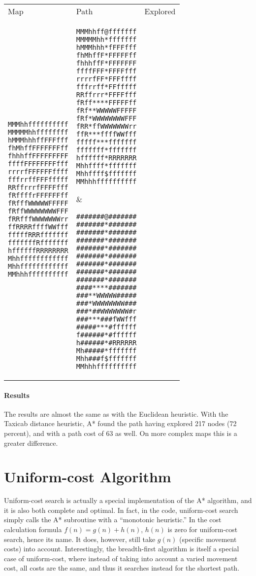 \documentclass[12pt, article]{scrartcl}
\begin{document}
\begin{tabular}{p{2in} p{2in} p{2in}}
Map & Path & Explored \\

\begin{verbatim}
MMMhhffffffffff
MMMMMhhffffffff
hMMMhhhffFFFfff
fhMhffFFFFFFFff
fhhhffFFFFFFFFF
ffffFFFFFFFFfff
rrrrfFFFFFFffff
fffrrffFFFfffff
RRffrrrfFFFFfff
fRffffrFFFFFFff
fRfffWWWWWFFFFF
fRffWWWWWWWWFFF
fRRfffWWWWWWWrr
ffRRRRffffWWfff
fffffRRRfffffff
fffffffRfffffff
hffffffRRRRRRRR
Mhhffffffffffff
Mhhffffffffffff
MMhhhffffffffff
\end{verbatim}
&
\begin{verbatim}
MMMhhff@fffffff
MMMMMhh*fffffff
hMMMhhh*fFFFfff
fhMhffF*FFFFFff
fhhhffF*FFFFFFF
ffffFFF*FFFFfff
rrrrfFF*FFFffff
fffrrff*FFfffff
RRffrrr*FFFFfff
fRff****FFFFFff
fRf**WWWWWFFFFF
fRf*WWWWWWWWFFF
fRR*ffWWWWWWWrr
ffR***ffffWWfff
fffff***fffffff
fffffff*fffffff
hffffff*RRRRRRR
Mhhffff*fffffff
Mhhffff$fffffff
MMhhhffffffffff
\end{verbatim}
&
\begin{verbatim}
#######@#######
#######*#######
#######*#######
#######*#######
#######*#######
#######*#######
#######*#######
#######*#######
#######*#######
####****#######
###**WWWWW#####
###*WWWWWWWW###
###*##WWWWWWW#r
###***###fWWfff
#####***#ffffff
f######*#ffffff
h######*#RRRRRR
Mh#####*fffffff
Mhh###f$fffffff
MMhhhffffffffff
\end{verbatim}
\end{tabular}
\paragraph{Results}
The results are almost the same as with the Euclidean heuristic. With the Taxicab distance heuristic, A* found the path having explored 217 nodes (72 percent), and with a path cost of 63 as well. On more complex maps this is a greater difference. \\

\section{Uniform-cost Algorithm}
Uniform-cost search is actually a special implementation of the A* algorithm, and it is also both complete and optimal. In fact, in the code, uniform-cost search simply calls the A* subroutine with a ``monotonic heuristic.'' In the cost calculation formula $f(n) = g(n) + h(n)$, $h(n)$ is zero for uniform-cost search, hence its name. It does, however, still take $g(n)$ (specific movement costs) into account. Interestingly, the breadth-first algorithm is itself a special case of uniform-cost, where instead of taking into account a varied movement cost, all costs are the same, and thus it searches instead for the shortest path. \\
\end{document}

